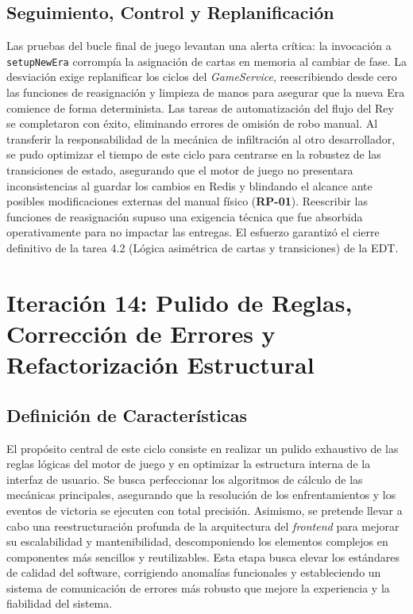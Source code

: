 \section{Seguimiento, Control y Replanificación}
Las pruebas del bucle final de juego levantan una alerta crítica: la invocación a \texttt{setupNewEra} corrompía la asignación de cartas en memoria al cambiar de fase. La desviación exige replanificar los ciclos del \textit{GameService}, reescribiendo desde cero las funciones de reasignación y limpieza de manos para asegurar que la nueva Era comience de forma determinista. Las tareas de automatización del flujo del Rey se completaron con éxito, eliminando errores de omisión de robo manual. Al transferir la responsabilidad de la mecánica de infiltración al otro desarrollador, se pudo optimizar el tiempo de este ciclo para centrarse en la robustez de las transiciones de estado, asegurando que el motor de juego no presentara inconsistencias al guardar los cambios en Redis y blindando el alcance ante posibles modificaciones externas del manual físico (\textbf{RP-01}). Reescribir las funciones de reasignación supuso una exigencia técnica que fue absorbida operativamente para no impactar las entregas. El esfuerzo garantizó el cierre definitivo de la tarea 4.2 (Lógica asimétrica de cartas y transiciones) de la EDT.


\chapter[Iteración 14: Pulido de Reglas y Corrección de Errores]{Iteración 14: Pulido de Reglas, Corrección de Errores y Refactorización Estructural}

\section{Definición de Características}
El propósito central de este ciclo consiste en realizar un pulido exhaustivo de las reglas lógicas del motor de juego y en optimizar la estructura interna de la interfaz de usuario. Se busca perfeccionar los algoritmos de cálculo de las mecánicas principales, asegurando que la resolución de los enfrentamientos y los eventos de victoria se ejecuten con total precisión. Asimismo, se pretende llevar a cabo una reestructuración profunda de la arquitectura del \textit{frontend} para mejorar su escalabilidad y mantenibilidad, descomponiendo los elementos complejos en componentes más sencillos y reutilizables. Esta etapa busca elevar los estándares de calidad del software, corrigiendo anomalías funcionales y estableciendo un sistema de comunicación de errores más robusto que mejore la experiencia y la fiabilidad del sistema.

